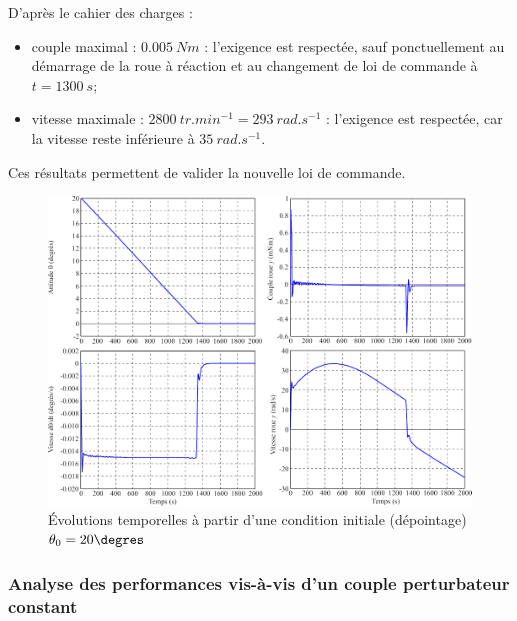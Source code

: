 \ifprof
\begin{corrige}
D'après le cahier des charges : 
\begin{itemize}
\item couple maximal : $\SI{0,005}{Nm}$ : l'exigence est respectée, sauf ponctuellement au démarrage de la roue à réaction et au changement de loi de commande à $t=\SI{1300}{s}$;
\item vitesse maximale : $\SI{2800}{tr.min^{-1}} = \SI{293}{rad.s^{-1}}$ : l'exigence est respectée, car la vitesse reste inférieure à $\SI{35}{rad.s^{-1}}$.
\end{itemize}
Ces résultats permettent de valider la nouvelle loi de commande.
\end{corrige}
\else
\fi

\ifprof
\else

\begin{figure}[H]
\centering
\includegraphics[width=.8\linewidth]{images/fig_14}
\caption{Évolutions temporelles à partir d’une condition initiale (dépointage) $\theta_0 = 20\degres$ \label{fig_14}}
\end{figure}
\fi

\subsubsection{\label{sec:3:D:3} Analyse des performances vis-à-vis d’un couple perturbateur constant}

